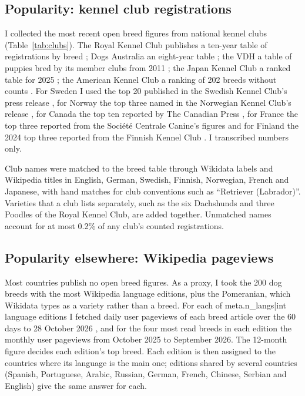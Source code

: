 \documentclass[11pt,a4paper]{article}
\begin{document}
\subsection{Popularity: kennel club registrations}
I collected the most recent open breed figures from national kennel clubs (Table~\ref{tab:clubs}). The Royal Kennel Club publishes a ten-year table of registrations by breed \citep{rkc}; Dogs Australia an eight-year table \citep{ankc}; the VDH a table of puppies bred by its member clubs from 2011 \citep{vdh}; the Japan Kennel Club a ranked table for 2025 \citep{jkc}; the American Kennel Club a ranking of 202 breeds without counts \citep{akc}. For Sweden I used the top 20 published in the Swedish Kennel Club's press release \citep{skk}, for Norway the top three named in the Norwegian Kennel Club's release \citep{nkk}, for Canada the top ten reported by The Canadian Press \citep{cp}, for France the top three reported from the Société Centrale Canine's figures \citep{breizh} and for Finland the 2024 top three reported from the Finnish Kennel Club \citep{verkko}. I transcribed numbers only.

Club names were matched to the breed table through Wikidata labels and Wikipedia titles in English, German, Swedish, Finnish, Norwegian, French and Japanese, with hand matches for club conventions such as ``Retriever (Labrador)''. Varieties that a club lists separately, such as the six Dachshunds and three Poodles of the Royal Kennel Club, are added together. Unmatched names account for at most 0.2\% of any club's counted registrations.

\subsection{Popularity elsewhere: Wikipedia pageviews}
Most countries publish no open breed figures. As a proxy, I took the 200 dog breeds with the most Wikipedia language editions, plus the Pomeranian, which Wikidata types as a variety rather than a breed. For each of {{meta.n_langs|int}} language editions I fetched daily user pageviews of each breed article over the 60 days to 28 October 2026 \citep{pageviews}, and for the four most read breeds in each edition the monthly user pageviews from October 2025 to September 2026. The 12-month figure decides each edition's top breed. Each edition is then assigned to the countries where its language is the main one; editions shared by several countries (Spanish, Portuguese, Arabic, Russian, German, French, Chinese, Serbian and English) give the same answer for each.
\end{document}
